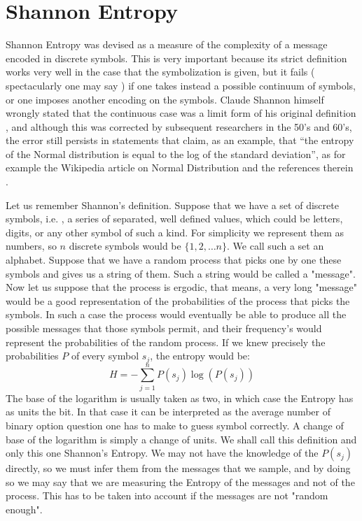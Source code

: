 \documentclass{article}
\begin{document}
\section{Shannon Entropy}


Shannon Entropy was devised as a measure of the complexity of a message encoded in discrete symbols. This is very important because its strict definition works very well in the case that the symbolization is given, but it fails ( spectacularly one may say ) if one takes instead a possible continuum of symbols, or one imposes another encoding on the symbols. Claude Shannon himself wrongly stated that the continuous case was a limit form
of his original definition \cite{Shannon1948}, and although this was corrected
by subsequent researchers in the 50's and 60's, the error still persists in statements
that claim, as an example, that ``the entropy of the Normal distribution is equal
to the log of the standard deviation'', as for example the Wikipedia article on
Normal Distribution and the references therein \cite{WikiNormal}. 


Let us remember Shannon's definition. Suppose that we have a set of discrete symbols, i.e. , a series of separated, well defined values, which could be letters, digits, or any other symbol of such a kind. For simplicity we represent them as numbers, so $n$ discrete symbols would be $\{1, 2, \ldots n \}$. We call such a set an alphabet. Suppose that we have a random process that picks one by one these symbols and gives us a string of them. Such a string would be called a "message". Now let us suppose that the process is ergodic, that means, a very long "message" would be a good representation of the probabilities of the process that picks the symbols. In such a case the process would eventually be able to produce all the possible messages that those symbols permit, and their frequency's would represent the probabilities of the random process. If we knew precisely the probabilities $P$ of every symbol $s_j$, the entropy would be:
\begin{equation}\label{eqDiffEnt}
  H=-\sum_{j=1}^n P(s_j) \log (P (s_j))
\end{equation}
The base of the logarithm is usually taken as two, in which case the Entropy has as units the bit. In that case it can be interpreted as the average number of binary option question one has to make to guess symbol correctly.  A change of base of the logarithm is simply a change of units. We shall call this definition and only this one Shannon's Entropy.
We may not have the knowledge of the $P(s_j)$ directly, so we must infer them from the messages that we sample, and by doing so we may say that we are measuring the Entropy of the messages and not of the process. This has to be taken into account if the messages are not "random enough".
\end{document}
